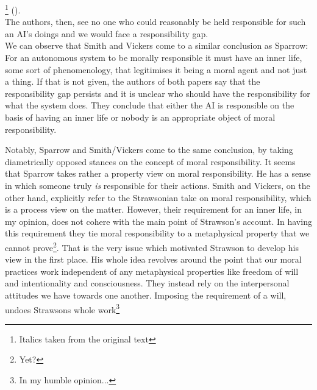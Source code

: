 \documentclass{article}
\begin{document}
\footnote{Italics
taken from the original text} (\cite[p. 4-5]{SmithVickers2021}).\\

The authors,
then, see no one who could reasonably be held responsible for such an AI's doings
and we would face a responsibility gap.\\

We can observe that Smith and Vickers come to a similar conclusion as Sparrow:
For an autonomous system to be morally responsible it must have an inner life,
some sort of phenomenology, that legitimises it being a moral agent and not just
a thing. If that is not given, the authors of both papers say that the
responsibility gap persists and it is unclear who should have the responsibility
for what the system does. They conclude that either the AI is responsible on the
basis of having an inner life or nobody is an appropriate object of moral
responsibility.

Notably, Sparrow and Smith/Vickers come to the same conclusion, by taking
diametrically opposed stances on the concept of moral responsibility. It seems
that Sparrow takes rather a property view on moral responsibility. He has a
sense in which someone truly \textit{is} responsible for their actions. Smith
and Vickers, on the other hand, explicitly refer to the Strawsonian take on
moral responsibility, which is a process view on the matter. However, their
requirement for an inner life, in my opinion, does not cohere with the main point
of Strawson's account. In having this requirement they tie moral responsibility
to a metaphysical property that we cannot prove\footnote{Yet?}. That is the very
issue which motivated Strawson to develop his view in the first place. His whole
idea revolves around the point that our moral practices work independent of any
metaphysical properties like freedom of will and intentionality and
consciousness. They instead rely on the interpersonal attitudes we have towards
one another. Imposing the requirement of a will, undoes Strawsons whole
work\footnote{In my humble opinion...}


\end{document}
